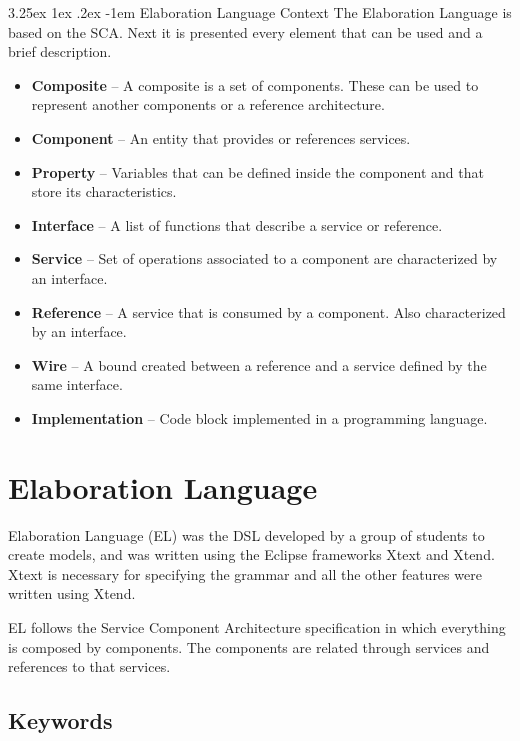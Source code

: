 \documentclass[11pt]{report}
\makeatletter
\renewcommand\paragraph{\@startsection{paragraph}{5}{\z@}%
	{3.25ex \@plus1ex \@minus.2ex}%
	{-1em}%
	{\normalfont\normalsize\bfseries}}
\makeatother
\begin{document}
		\paragraph{Elaboration Language Context} The Elaboration Language is based on the SCA. Next it is presented every element that can be used and a brief description.
		\begin{itemize}
			\item \textbf{Composite} -- A composite is a set of components. These can be used to represent another components or a reference architecture.
			\item \textbf{Component} -- An entity that provides or references services. 
			\item \textbf{Property} -- Variables that can be defined inside the component and that store its characteristics.
			\item \textbf{Interface} -- A list of functions that describe a service or reference.
			\item \textbf{Service} -- Set of operations associated to a component are characterized by an interface. 
			\item \textbf{Reference} -- A service that is consumed by a component. Also characterized by an interface.
			\item \textbf{Wire} -- A bound created between a reference and a service defined by the same interface.
			\item \textbf{Implementation} -- Code block implemented in a programming language.
		\end{itemize}

	\section{Elaboration Language}
	
	\par Elaboration Language (EL) was the DSL developed by a group of students to create models, and was written using the Eclipse frameworks Xtext and Xtend. Xtext is necessary for specifying the grammar and all the other features were written using Xtend. 
	\par EL follows the Service Component Architecture specification in which everything is composed by components. The components are related through services and references to that services. 

		\subsection{Keywords}
		
\end{document}

